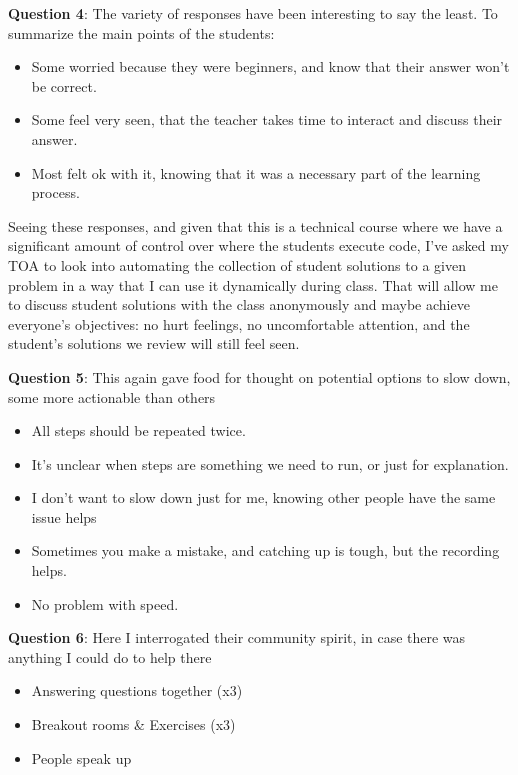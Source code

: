 \documentclass[paper=a4,justified,a4paper]{tufte-handout}
\providecommand{\tightlist}{%
  \setlength{\itemsep}{0pt}\setlength{\parskip}{0pt}}
\begin{document}
\textbf{Question 4}: The variety of responses have been interesting to
say the least. To summarize the main points of the students:

\begin{itemize}
\tightlist
\item
  Some worried because they were beginners, and know that their answer
  won't be correct.
\item
  Some feel very seen, that the teacher takes time to interact and
  discuss their answer.
\item
  Most felt ok with it, knowing that it was a necessary part of the
  learning process.
\end{itemize}

Seeing these responses, and given that this is a technical course where
we have a significant amount of control over where the students execute
code, I've asked my TOA to look into automating the collection of
student solutions to a given problem in a way that I can use it
dynamically during class. That will allow me to discuss student
solutions with the class anonymously and maybe achieve everyone's
objectives: no hurt feelings, no uncomfortable attention, and the
student's solutions we review will still feel seen.

\textbf{Question 5}: This again gave food for thought on potential
options to slow down, some more actionable than others

\begin{itemize}
\tightlist
\item
  All steps should be repeated twice.
\item
  It's unclear when steps are something we need to run, or just for
  explanation.
\item
  I don't want to slow down just for me, knowing other people have the
  same issue helps
\item
  Sometimes you make a mistake, and catching up is tough, but the
  recording helps.
\item
  No problem with speed.
\end{itemize}

\textbf{Question 6}: Here I interrogated their community spirit, in case
there was anything I could do to help there

\begin{itemize}
\tightlist
\item
  Answering questions together (x3)
\item
  Breakout rooms \& Exercises (x3)
\item
  People speak up
\end{itemize}
\end{document}
